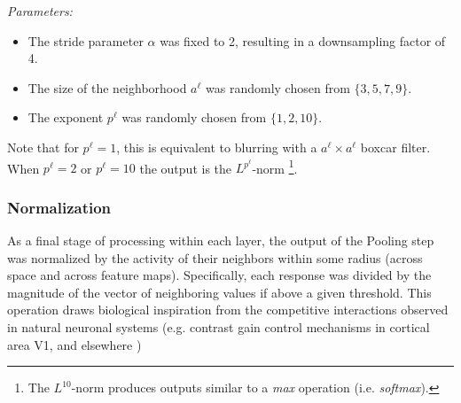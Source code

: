 \emph{Parameters:}
\begin{itemize}
\item The stride parameter $\alpha$ was fixed to 2, resulting in a downsampling
  factor of 4.
\item The size of the neighborhood $a^{\ell}$ was randomly chosen from
  $\{3,5,7,9\}$.
\item The exponent $p^{\ell}$ was randomly chosen from $\{1, 2, 10\}$.
\end{itemize}
Note that for $p^{\ell}=1$, this is equivalent to blurring with a $a^{\ell}
\times a^{\ell}$ boxcar filter.  When $p^{\ell}=2$ or $p^{\ell}=10$ the output
is the $L^{p^{\ell}}$-norm
\footnote{The $L^{10}$-norm produces outputs similar to a \emph{max} operation
  (i.e. \emph{softmax}).}.



\subsubsection{Normalization}

As a final stage of processing within each layer, the output of the Pooling step
was normalized by the activity of their neighbors within some radius (across
space and across feature maps).  Specifically, each response was divided by the
magnitude of the vector of neighboring values if above a given threshold.  This
operation draws biological inspiration from the competitive interactions
observed in natural neuronal systems (e.g. contrast gain control mechanisms in
cortical area V1, and elsewhere \cite{geisler1992cni,rolls2002cnv})


